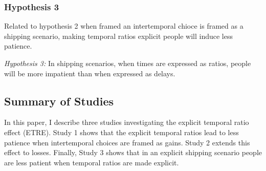 \documentclass[]{article}
\begin{document}
\subsubsection{Hypothesis 3}
Related to hypothesis 2 when framed an intertemporal chioce is framed as a shipping scenario,  making temporal ratios explicit people will induce less patience. 

\textit{Hypothesis 3:} In shipping scenarios, when times are expressed as ratios, people will be more impatient than when expressed as delays. 


\subsection{Summary of Studies}

In this paper, I describe three studies investigating the explicit temporal ratio effect (ETRE).
Study 1 shows that the explicit temporal ratios lead to less patience when intertemporal choices are framed as gains.
Study 2 extends this effect to losses.
Finally, Study 3 shows that in an explicit shipping scenario people are less patient when temporal ratios are made explicit. 

 

%
%
\end{document}
